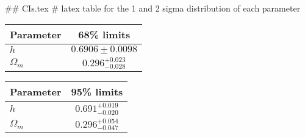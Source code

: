 ## CIs.tex
# latex table for the 1 and 2 sigma distribution of each parameter

\begin{tabular} { l  c}
 Parameter &  68\% limits\\
\hline
{\boldmath$h              $} & $0.6906\pm 0.0098          $\\
{\boldmath$\Omega_m       $} & $0.296^{+0.023}_{-0.028}   $\\
\hline
\end{tabular}

\begin{tabular} { l  c}
 Parameter &  95\% limits\\
\hline
{\boldmath$h              $} & $0.691^{+0.019}_{-0.020}   $\\
{\boldmath$\Omega_m       $} & $0.296^{+0.054}_{-0.047}   $\\
\hline
\end{tabular}
